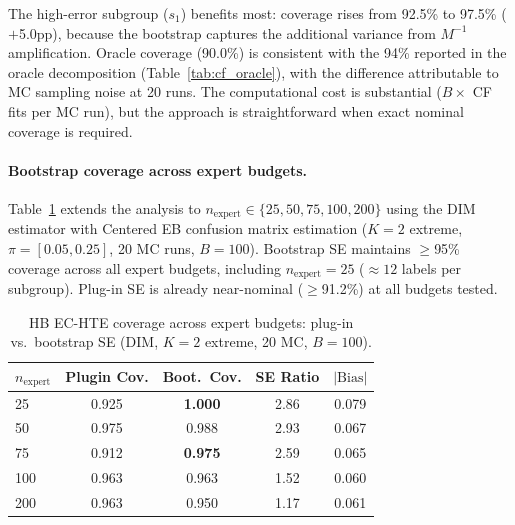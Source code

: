 \begin{table}[h]
\centering
\caption{CausalForest coverage: plug-in SE vs.\ full bootstrap SE ($B{=}100$, $n_{\text{estimators}}{=}200$, 20 MC runs). Bootstrap SE is ${\sim}1.15\times$ plug-in.}
\label{tab:bootstrap_se}
\small
{}
\end{table}

The high-error subgroup ($s_1$) benefits most: coverage rises from 92.5\% to 97.5\% ($+$5.0pp), because the bootstrap captures the additional variance from $M^{-1}$ amplification.
Oracle coverage (90.0\%) is consistent with the 94\% reported in the oracle decomposition (Table~\ref{tab:cf_oracle}), with the difference attributable to MC sampling noise at 20 runs.
The computational cost is substantial ($B \times$ CF fits per MC run), but the approach is straightforward when exact nominal coverage is required.

\paragraph{Bootstrap coverage across expert budgets.}
Table~\ref{tab:bootstrap_small_n} extends the analysis to $n_{\text{expert}} \in \{25, 50, 75, 100, 200\}$ using the DIM estimator with Centered EB confusion matrix estimation ($K{=}2$ extreme, $\pi{=}[0.05, 0.25]$, 20 MC runs, $B{=}100$).
Bootstrap SE maintains $\geq$95\% coverage across all expert budgets, including $n_{\text{expert}}{=}25$ (${\approx}12$ labels per subgroup).
Plug-in SE is already near-nominal ($\geq$91.2\%) at all budgets tested.

\begin{table}[h]
\centering
\caption{HB EC-HTE coverage across expert budgets: plug-in vs.\ bootstrap SE (DIM, $K{=}2$ extreme, 20 MC, $B{=}100$).}
\label{tab:bootstrap_small_n}
\small
\begin{tabular}{lcccc}
\toprule
$n_{\text{expert}}$ & Plugin Cov. & Boot.\ Cov. & SE Ratio & $|\text{Bias}|$ \\
\midrule
25 & 0.925 & \textbf{1.000} & 2.86 & 0.079 \\
50 & 0.975 & 0.988 & 2.93 & 0.067 \\
75 & 0.912 & \textbf{0.975} & 2.59 & 0.065 \\
100 & 0.963 & 0.963 & 1.52 & 0.060 \\
200 & 0.963 & 0.950 & 1.17 & 0.061 \\
\bottomrule
\end{tabular}
\end{table}

